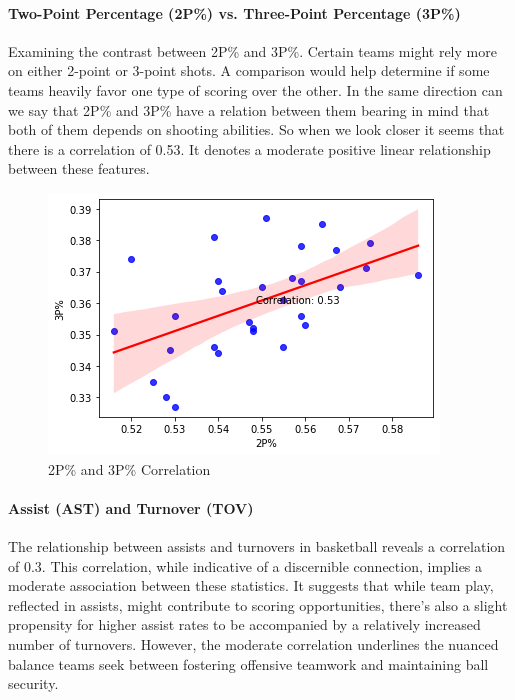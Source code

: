 \documentclass[conference]{IEEEtran}
\begin{document}
\paragraph {Two-Point Percentage (2P\%) vs. Three-Point Percentage (3P\%)}
Examining the contrast between 2P\% and 3P\%. Certain teams might rely more on either 2-point or 3-point shots. A comparison would help determine if some teams heavily favor one type of scoring over the other. In the same direction can we say that 2P\% and 3P\% have a relation between them bearing in mind that both of them depends on shooting abilities. So when we look closer it seems that there is a correlation of 0.53. It denotes a moderate positive linear relationship between these features.

\begin{figure}[h]
    \centering
    \includegraphics[scale=0.6]{2P-3P-COR.png}
    \caption{2P\% and 3P\% Correlation}
    \label{fig:enter-label}
\end{figure}

\paragraph {Assist (AST) and Turnover (TOV)}
The relationship between assists and turnovers in basketball reveals a correlation of 0.3. This correlation, while indicative of a discernible connection, implies a moderate association between these statistics. It suggests that while team play, reflected in assists, might contribute to scoring opportunities, there's also a slight propensity for higher assist rates to be accompanied by a relatively increased number of turnovers. However, the moderate correlation underlines the nuanced balance teams seek between fostering offensive teamwork and maintaining ball security.
\end{document}
